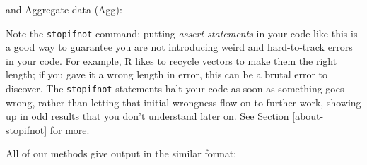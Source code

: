 \documentclass[
]{book}
\newenvironment{Shaded}{\begin{snugshade}}{\end{snugshade}}
\newcommand{\AttributeTok}[1]{\textcolor[rgb]{0.13,0.29,0.53}{#1}}
\newcommand{\ControlFlowTok}[1]{\textcolor[rgb]{0.13,0.29,0.53}{\textbf{#1}}}
\newcommand{\DecValTok}[1]{\textcolor[rgb]{0.00,0.00,0.81}{#1}}
\newcommand{\FunctionTok}[1]{\textcolor[rgb]{0.13,0.29,0.53}{\textbf{#1}}}
\newcommand{\NormalTok}[1]{#1}
\newcommand{\OtherTok}[1]{\textcolor[rgb]{0.56,0.35,0.01}{#1}}
\newcommand{\SpecialCharTok}[1]{\textcolor[rgb]{0.81,0.36,0.00}{\textbf{#1}}}
\newcommand{\StringTok}[1]{\textcolor[rgb]{0.31,0.60,0.02}{#1}}
\begin{document}
and Aggregate data (Agg):

\begin{Shaded}
\end{Shaded}

Note the \texttt{stopifnot} command: putting \emph{assert statements} in your code like this is a good way to guarantee you are not introducing weird and hard-to-track errors in your code.
For example, R likes to recycle vectors to make them the right length; if you gave it a wrong length in error, this can be a brutal error to discover.
The \texttt{stopifnot} statements halt your code as soon as something goes wrong, rather than letting that initial wrongness flow on to further work, showing up in odd results that you don't understand later on.
See Section \ref{about-stopifnot} for more.

All of our methods give output in the similar format:
\end{document}
